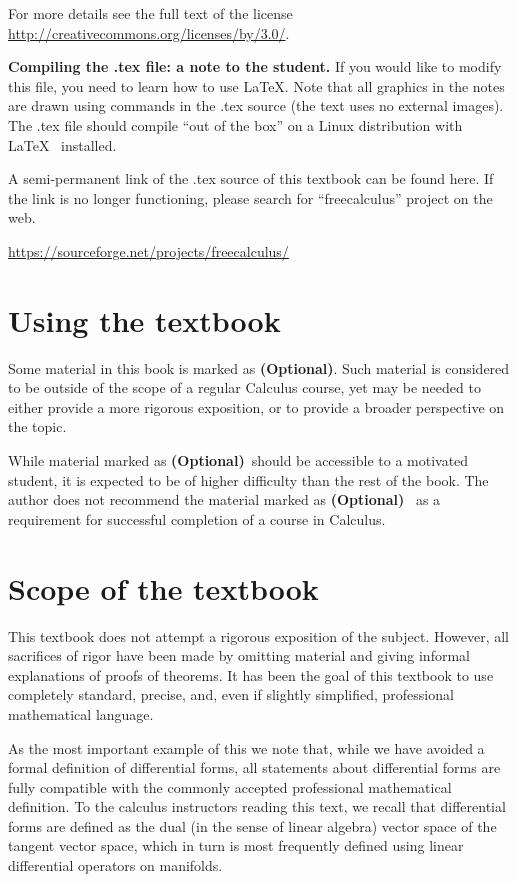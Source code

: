 \documentclass[12pt]{book}
\newcommand{\optionalMaterial}{\textbf{(Optional)}}
\begin{document}
For more details see the full text of the license \url{http://creativecommons.org/licenses/by/3.0/}.

\noindent \textbf{Compiling the .tex file: a note to the student.} If you would like to modify this file, you need to learn how to use \LaTeX. Note that all graphics in the notes are drawn using commands in the .tex source (the text uses no external images). The .tex file should compile ``out of the box'' on a Linux distribution with \LaTeX~ installed.

A semi-permanent link of the .tex source of this textbook can be found here. If the link is no longer functioning, please search for ``freecalculus'' project on the web.

\url{https://sourceforge.net/projects/freecalculus/}

\section*{Using the textbook}

Some material in this book is marked as \optionalMaterial. Such material is considered to be outside of the scope of a regular Calculus course, yet may be needed to either provide a more rigorous exposition, or to provide a broader perspective on the topic.

While material marked as \optionalMaterial ~should be accessible to a motivated student, it is expected to be of higher difficulty than the rest of the book. The author does not recommend the material marked as \optionalMaterial ~ as a requirement for successful completion of a course in Calculus.

\section*{Scope of the textbook}
This textbook does not attempt a rigorous exposition of the subject. However, all sacrifices of rigor have been made by omitting material and giving informal explanations of proofs of theorems. It has been the goal of this textbook to use completely standard, precise, and, even if slightly simplified, professional mathematical language.

As the most important example of this we note that, while we have avoided a formal definition of differential forms, all statements about differential forms are fully compatible with the commonly accepted professional mathematical definition. To the calculus instructors reading this text, we recall that differential forms are defined as the dual (in the sense of linear algebra) vector space of the tangent vector space, which in turn is most frequently defined using linear differential operators on manifolds.
\end{document}
